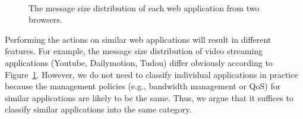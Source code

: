 \begin{figure}[H]
\centering
{}\\
\caption{The message size distribution of each web application from two browsers.}
\label{Fig.msg_size_distribution}
\end{figure}

Performing the actions on similar web applications will result in different features. For example, the message size distribution of video streaming applications (Youtube, Dailymotion, Tudou) differ obviously according to Figure~\ref{Fig.msg_size_distribution}. However, we do not need to classify individual applications in practice because the management policies (e.g., bandwidth management or QoS) for similar applications are likely to be the same. Thus, we argue that it suffices to classify similar applications into the same category.

